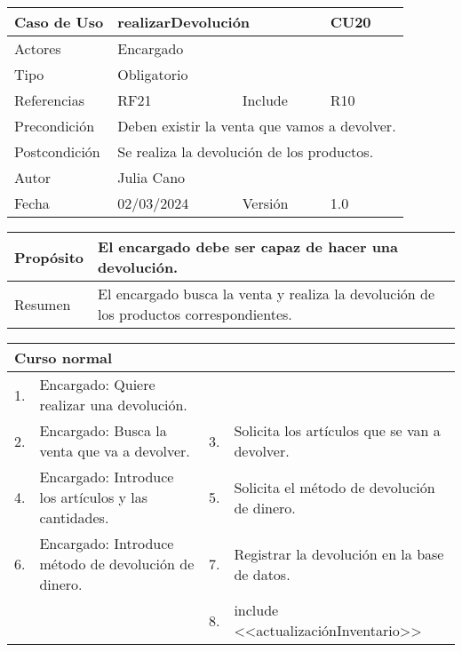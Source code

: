 \begin{table}[H]
	\centering
	\begin{tabular}{| m{} | m{} | m{} | m{}|}
		\hline
		\rowcolor{grayshade} Caso de Uso & \multicolumn{2}{|m{0.43\textwidth}|}{realizarDevolución} &  CU20\\ 
		\hline
		Actores & \multicolumn{3}{l|}{Encargado} \\ 
		\hline
		Tipo & \multicolumn{3}{l|}{Obligatorio} \\ 
		\hline
		Referencias & RF21 & Include & R10 \\ 
		\hline
		Precondición & \multicolumn{3}{m{0.67\textwidth}|}{Deben existir la venta que vamos a devolver.} \\ 
		\hline
		Postcondición & \multicolumn{3}{m{0.67\textwidth}|}{Se realiza la devolución de los productos.} \\ 
		\hline
		Autor & \multicolumn{3}{l|}{Julia Cano} \\ 
		\hline
		Fecha & 02/03/2024 & Versión & 1.0 \\
		\hline
	\end{tabular}
\end{table}

\begin{table}[H]
	\centering
	\begin{tabular}{| m{} | m{} | m{} | m{} |}
		\hline
		Propósito & \multicolumn{3}{m{0.67\textwidth}|}{El encargado debe ser capaz de hacer una devolución.}  \\ 
		\hline
		Resumen & \multicolumn{3}{m{0.67\textwidth}|}{El encargado busca la venta y realiza la devolución de los productos correspondientes. } \\ 
		\hline
	\end{tabular}
\end{table}


\begin{table}[H]
	\centering
	\begin{tabular}{| m{} | m{} | m{} | m{} |}
		\hline
		\multicolumn{4}{|m{0.9\textwidth}|}{Curso normal}     \\ 
		\hline
		1. & Encargado: Quiere realizar una devolución. &  &    \\ 
		\hline
		2. & Encargado: Busca la venta que va a devolver. & 3. &  Solicita los artículos que se van a devolver.  \\ 
		\hline
		4. & Encargado: Introduce los artículos y las cantidades. & 5. &  Solicita el método de devolución de dinero.  \\ 
		\hline
		6. & Encargado: Introduce método de devolución de dinero. & 7. & Registrar la devolución en la base de datos.  \\ 
		\hline
		&  & 8. &  include <<actualizaciónInventario>>  \\ 
		\hline
	\end{tabular}
\end{table}

